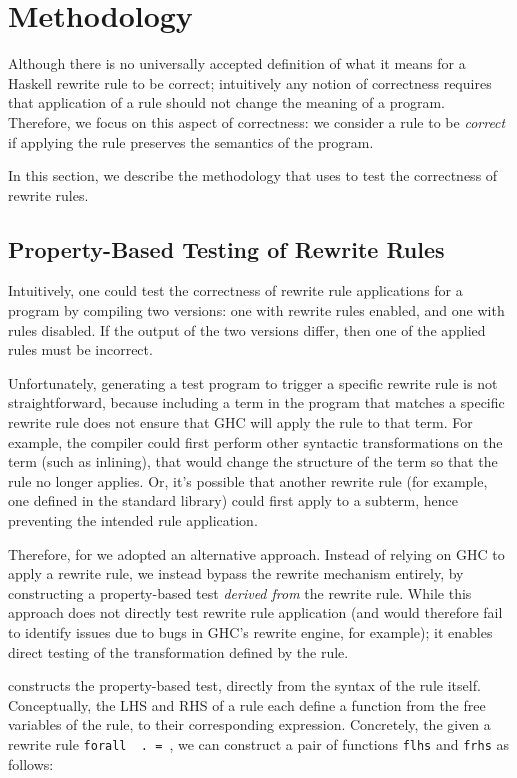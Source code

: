 \section{Methodology}
\label{sec:methodology}

Although there is no universally accepted definition of what it means for a
Haskell rewrite rule to be correct; intuitively any notion of correctness
requires that application of a rule should not change the meaning of a program.
Therefore, we focus on this aspect of correctness: we consider a rule to be
\textit{correct} if applying the rule preserves the semantics of the program.

In this section, we describe the methodology that \Rulecheck uses to test the
correctness of rewrite rules.

\subsection{Property-Based Testing of Rewrite Rules}\label{sec:methodology:testgen}

Intuitively, one could test the correctness of rewrite rule applications for a
program by compiling two versions: one with rewrite rules enabled, and one with
rules disabled. If the output of the two versions differ, then one of the
applied rules must be incorrect.

Unfortunately, generating a test program to trigger a specific rewrite rule is
not straightforward, because including a term in the program that matches a
specific rewrite rule does not ensure that GHC will apply the rule to that term.
For example, the compiler could first perform other syntactic transformations on
the term (such as inlining), that would change the structure of the term so that
the rule no longer applies. Or, it's possible that another rewrite rule (for
example, one defined in the standard library) could first apply to a subterm,
hence preventing the intended rule application.

Therefore, for \Rulecheck we adopted an alternative approach. Instead of relying
on GHC to apply a rewrite rule, we instead bypass the rewrite mechanism
entirely, by constructing a property-based test \textit{derived from} the
rewrite rule. While this approach does not directly test rewrite rule
application (and would therefore fail to identify issues due to bugs in GHC's
rewrite engine, for example); it enables direct testing of the transformation
defined by the rule.

\Rulecheck constructs the property-based test, directly from the syntax of the
rule itself. Conceptually, the LHS and RHS of a rule each define a function from
the free variables of the rule, to their corresponding expression. Concretely,
the given a rewrite rule \texttt{forall \rbinders~.~\rlhs = \rrhs}, we can
construct a pair of functions \texttt{flhs} and \texttt{frhs} as follows:

